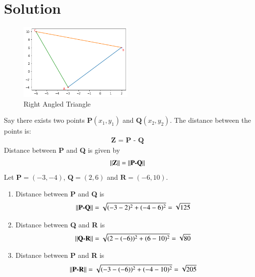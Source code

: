 \documentclass[journal,12pt,twocolumn]{IEEEtran}
\begin{document}
\section{Solution}
\begin{figure}[h!]

\centering
\includegraphics[width=0.5\textwidth]{Figure_1}
\caption{Right Angled Triangle\label{fig:triangle}}

\end{figure}
Say there exists two points $\textbf{P}(x_1, y_1)$ and $\textbf{Q}(x_2, y_2)$. The distance between the points is:
\begin{align}
    \textbf{Z = P - Q}
\end{align}
Distance between \textbf{P} and \textbf{Q} is given by 
\begin{align}
||\textbf{Z}|| = \left\lVert\textbf{P-Q}\right\rVert
\end{align}
Let $\textbf{P} = (-3, -4)$, $\textbf{Q} = (2, 6)$ and $\textbf{R} = (-6, 10)$.
\begin{enumerate}
    \item Distance between \textbf{P} and \textbf{Q} is 
\begin{align}
\left\lVert\textbf{P-Q}\right\rVert = \sqrt{(-3-2)^2+(-4-6)^2}
=\sqrt{125}
\end{align}
\item Distance between \textbf{Q} and \textbf{R} is 
\begin{align}
\left\lVert\textbf{Q-R}\right\rVert = \sqrt{(2-(-6))^2+(6-10)^2}
=\sqrt{80}
\end{align}
\item Distance between \textbf{P} and \textbf{R} is 
\begin{align}
\left\lVert\textbf{P-R}\right\rVert = \sqrt{(-3-(-6))^2+(-4-10)^2}
=\sqrt{205}
\end{align}
\end{enumerate}
\end{document}
